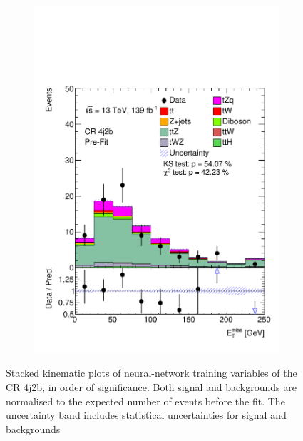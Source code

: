 \begin{figure}[!h]
\begin{subfigure}[b]{0.33\linewidth}
    \includegraphics[width=\linewidth]{ubonn-thesis/Chapters/Chapters_06/Figure/Input_distribution/CR_4j2b_MissEt.pdf} 
  \end{subfigure}
  \caption{Stacked kinematic plots of neural-network training variables of the CR 4j2b, in order of significance. Both signal and backgrounds are normalised to the expected number of events before the fit. The uncertainty band includes statistical uncertainties for signal and backgrounds}
  \label{fig_control5}
  \end{figure}

\clearpage


